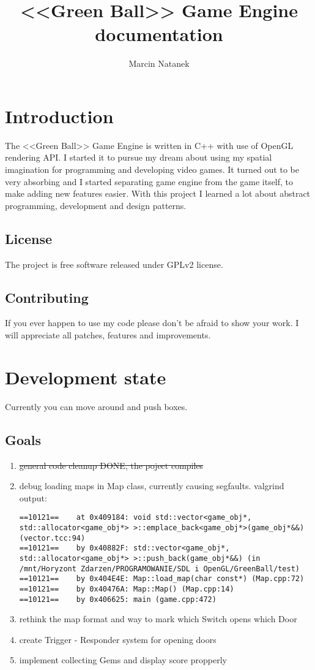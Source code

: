 \documentclass[11pt,a4paper,oneside]{report}
\title{<<Green Ball>> Game Engine documentation}
\author{Marcin Natanek}
\begin{document}
\maketitle
\pagebreak
\tableofcontents
\pagebreak

\chapter{Introduction}
The <<Green Ball>> Game Engine is written in C++ with use of OpenGL rendering API. I started it to pursue my dream about using my spatial imagination for programming and developing video games. It turned out to be very absorbing and I started separating game engine from the game itself, to make adding new features easier. With this project I learned a lot about abstract programming, development and design patterns.

\section{License}
The project is free software released under GPLv2 license.

\section{Contributing}
If you ever happen to use my code please don't be afraid to show your work. I will appreciate all patches, features and improvements.

\chapter{Development state}
Currently you can move around and push boxes.
\section{Goals}
\begin{enumerate}
	\item \st{general code cleanup DONE, the poject compiles}
	\item debug loading maps in Map class, currently causing segfaults. valgrind output:
		\begin{lstlisting}
==10121==    at 0x409184: void std::vector<game_obj*, std::allocator<game_obj*> >::emplace_back<game_obj*>(game_obj*&&) (vector.tcc:94)
==10121==    by 0x40882F: std::vector<game_obj*, std::allocator<game_obj*> >::push_back(game_obj*&&) (in /mnt/Horyzont Zdarzen/PROGRAMOWANIE/SDL i OpenGL/GreenBall/test)
==10121==    by 0x404E4E: Map::load_map(char const*) (Map.cpp:72)
==10121==    by 0x40476A: Map::Map() (Map.cpp:14)
==10121==    by 0x406625: main (game.cpp:472)
		\end{lstlisting}
	\item rethink the map format and way to mark which Switch opens which Door
	\item create Trigger - Responder system for opening doors
	\item implement collecting Gems and display score propperly
\end{enumerate}
\end{document}
